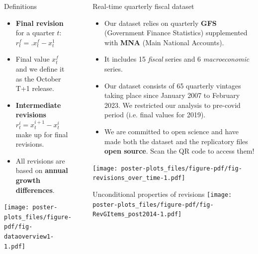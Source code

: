 \documentclass[final]{beamer}
\newlength{\sepwidth}
\newlength{\colwidth}
\newcommand{\separatorcolumn}{\begin{column}{\sepwidth}\end{column}}
\begin{document}
\begin{frame}[t]
\begin{columns}[t]
\begin{column}{\colwidth}
  \begin{block}{Definitions}
    \begin{itemize}
      \item \textbf{Final revision} for a quarter $t$: $r_t^f =. x_t^f - x_t^1$
      \item Final value $x_t^f$ and we define it as the October T+1 release.
      \item \textbf{Intermediate revisions} $r_t^i = x_t^{i+1} - x_t^i$ make up for final revisions.
      \item All revisions are based on \textbf{annual growth differences}.
  \end{itemize}

  \texttt{[image: poster-plots\_files/figure-pdf/fig-dataoverview1-1.pdf]} 

  \end{block}
\end{column}

\separatorcolumn

\begin{column}{\colwidth}

  \begin{block}{Real-time quarterly fiscal dataset}
    \begin{itemize}
      \item Our dataset relies on quarterly \textbf{GFS} (Government Finance Statistics) supplemented with \textbf{MNA} (Main National Accounts).
      \item It includes 15 \textit{fiscal} series and 6 \textit{macroeconomic} series. 
      \item Our dataset consists of 65 quarterly vintages taking place since January 2007 to February 2023. We restricted our analysis to pre-covid period (i.e. final values for 2019).
      \item We are committed to open science and have made both the dataset and the replicatory files \textbf{open source}. Scan the QR code to access them!
    \end{itemize}

    \texttt{[image: poster-plots\_files/figure-pdf/fig-revisions\_over\_time-1.pdf]} 


  \end{block}

  \begin{block}{Unconditional properties of revisions}
    \texttt{[image: poster-plots\_files/figure-pdf/fig-RevGItems\_post2014-1.pdf]} 


\end{block}
\end{column}
\end{columns}
\end{frame}
\end{document}
